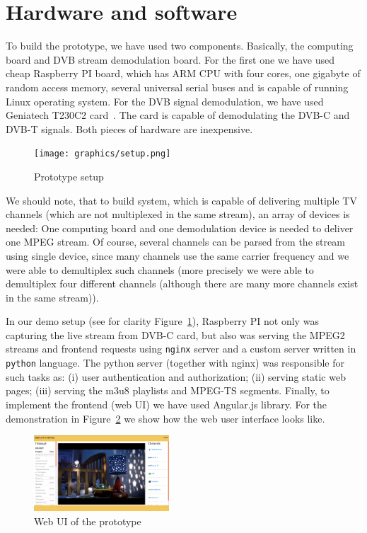 \section{Hardware and software}
\label{sec:hardware}

To build the prototype, we have used two components. Basically, the computing board
and DVB stream demodulation board. For the first one we have used cheap Raspberry PI
board, which has ARM CPU with four cores, one gigabyte of random access memory, several 
universal serial buses and is capable of running Linux operating system. For the DVB signal
demodulation, we have used Geniatech T230C2 card~\cite{geniatech230}. The card is capable 
of demodulating the DVB-C and DVB-T signals. Both pieces of hardware are inexpensive.

\begin{figure}[ht]
\texttt{[image: graphics/setup.png]}
\caption{Prototype setup}
\label{fig:setup}
\end{figure}

We should note, that to build system, which is capable of delivering multiple TV channels 
(which are not multiplexed in the same stream), an array of devices is needed: 
One computing board and one demodulation device is needed to deliver one MPEG 
stream. Of course, several channels can be parsed from the stream using single device, since many 
channels use the same carrier frequency and we were able to demultiplex such channels (more 
precisely we were able to demultiplex four different channels (although there are many more
channels exist in the same stream)). 

In our demo setup (see for clarity Figure~\ref{fig:setup}), Raspberry PI not only was 
capturing the live stream from DVB-C card, but also was serving the MPEG2 streams and 
frontend requests using \texttt{nginx} server and a custom server written in 
\texttt{python} language. The python server (together with nginx) was responsible for such tasks as: 
(i) user authentication and authorization; (ii) serving static web pages; (iii) 
serving the m3u8 playlists and MPEG-TS segments. Finally, to implement the frontend 
(web UI) we have used Angular.js library. For the demonstration in Figure~\ref{fig:web_ui}
we show how the web user interface looks like.

\begin{figure}[ht]
\includegraphics[width=0.45\textwidth]{graphics/web_ui.png}
\caption{Web UI of the prototype}
\label{fig:web_ui}
\end{figure}

